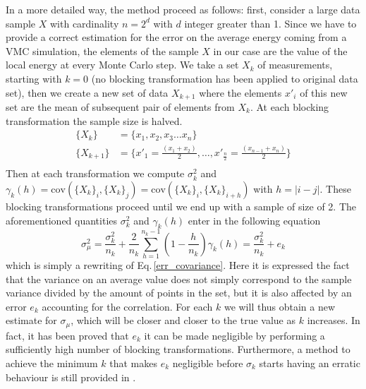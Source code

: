 In a more detailed way, the method proceed as follows: first, consider a large data sample $X$ with cardinality $n=2^d$ with $d$ integer greater than 1. Since we have to provide a correct estimation for the error on the average energy coming from a VMC simulation, the elements of the sample $X$ in our case are the value of the local energy at every Monte Carlo step. We take a set $X_k$ of measurements, starting with $k=0$ (no blocking transformation has been applied to original data set), then we create a new set of data $X_{k+1}$ where the elements $x'_i$ of this new set  are the mean of subsequent pair of elements from $X_k$. At each blocking transformation the sample size is halved.
\begin{align*}
    \{X_k\} &= \{x_1, x_2, x_3 \dots x_n\} \\
    \{X_{k+1}\} &= \bigg\{x'_1=\frac{(x_1+x_2)}{2}, \dots , x'_{\frac{n}{2}}=\frac{(x_{n-1} + x_{n})}{2} \bigg\} \\
\end{align*}
Then at each transformation we compute $\sigma_k^2$ and $\gamma_k(h) = \text{cov}(\{X_k\}_i , \{X_k\}_j)=\text{cov}(\{X_k\}_i , \{X_k\}_{i+h})$ with $h =|i-j|$. These blocking transformations proceed until we end up with a sample of size of 2. The aforementioned quantities $\sigma_k^2$ and $\gamma_k(h)$ enter in the following equation
\begin{equation}
    \sigma_{\mu}^2 = \frac{\sigma_k^2}{n_k} + \frac{2}{n_k}\sum_{h=1}^{n_k - 1} \left(1-\frac{h}{n_k}\right)\gamma_k(h) = \frac{\sigma_k^2}{n_k} +e_k
    \label{eq:blocking_method}
\end{equation}
which is simply a rewriting of Eq.\,\ref{err_covariance}. Here it is expressed the fact that the variance on an average value does not simply correspond to the sample variance divided by the amount of points in the set, but it is also affected by an error $e_k$ accounting for the correlation. For each $k$ we will thus obtain a new estimate for $\sigma_{\mu}$, which will be closer and closer to the true value as $k$ increases. In fact, it has been proved \cite{Marius} that $e_k$ it can be made negligible by performing a sufficiently high number of blocking transformations. Furthermore, a method to achieve the minimum $k$ that makes $e_k$ negligible before $\sigma_k$ starts having an erratic behaviour is still provided in \cite{Marius}. 

